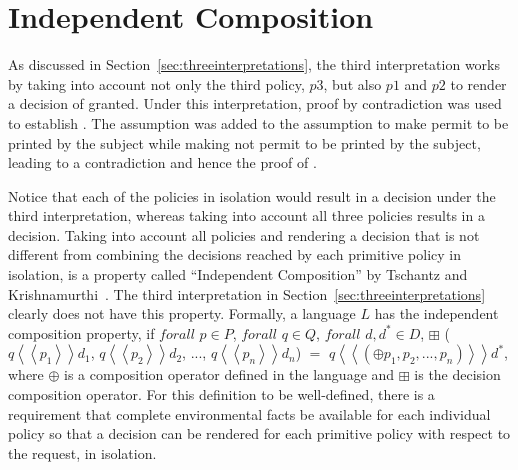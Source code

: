 \section{Independent Composition}

As discussed in Section~\ref{sec:threeinterpretations}, the third interpretation works by taking into account not only the third policy, $p3$, but also $p1$ and $p2$ to render a decision of granted. Under this interpretation, proof by contradiction was used to establish . The assumption  was added to the assumption  to make  permit  to be printed by the subject while making  not permit  to be printed by the subject, leading to a contradiction and hence the proof of . 

Notice that each of the policies in isolation would result in a  decision under the third interpretation, whereas taking into account all three policies results in a  decision. Taking into account all policies and rendering a decision that is not different from combining the decisions reached by each primitive policy in isolation, is a property called ``Independent Composition'' by Tschantz and Krishnamurthi~\cite{Tschantz}. The third interpretation in Section~\ref{sec:threeinterpretations} clearly does not have this property. Formally, a language $L$ has the independent composition property, if $forall$ $p \in P$, $forall$ $q \in Q$, $forall$ $d, d^\ast \in D$, $\boxplus$ ($q \left\langle\left\langle p_{1}  \right\rangle\right\rangle d_{1}$, $q \left\langle\left\langle p_{2}  \right\rangle\right\rangle d_{2}$, ..., $q \left\langle\left\langle p_{n}  \right\rangle\right\rangle d_{n}$) $=$ $q \left\langle\left\langle (\oplus p_{1}, p_{2}, ..., p_{n}) \right\rangle\right\rangle d^\ast$, \\where $\oplus$ is a composition operator defined in the language and $\boxplus$ is the decision composition operator. For this definition to be well-defined, there is a requirement that complete environmental facts be available for each individual policy so that a decision can be rendered for each primitive policy with respect to the request, in isolation.

